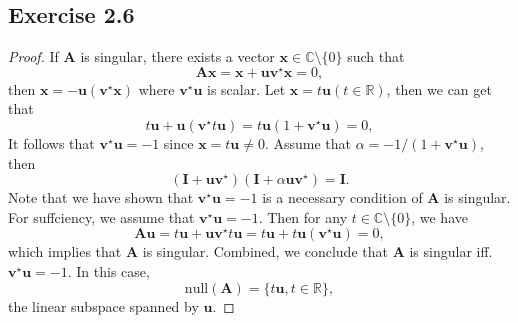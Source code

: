 \documentclass{article}
\begin{document}
\subsection{Exercise 2.6}
    \begin{proof}
        If $\bm{A}$ is singular, there exists a vector $\bm{x} \in \mathbb{C}\setminus \{0\}$ such that
        $$
         \bm{Ax} = \bm{x} + \bm{u}\bm{v}^{\star} \bm{x} = 0,
        $$
        then $\bm{x} = -\bm{u}(\bm{v}^{\star} \bm{x})$ where $\bm{v}^{\star} \bm{u}$ is scalar. Let $\bm{x} = t\bm{u} (t \in \mathbb{R})$, then we can get that 
        $$
        t\bm{u} + \bm{u} (\bm{v}^{\star} t \bm{u}) = t\bm{u} (1+ \bm{v}^{\star} \bm{u}) = 0,
        $$
        It follows that $\bm{v}^{\star} \bm{u} = -1$ since $\bm{x} = t\bm{u} \neq 0$. Assume that $\alpha = -1/(1 + \bm{v}^{\star} \bm{u})$, then
        $$
        (\bm{I}+\bm{u} \bm{v}^{\star})(\bm{I} + \alpha \bm{u}\bm{v}^{\star}) = \bm{I}.
        $$
        Note that we have shown that $\bm{v}^{\star}\bm{u} = -1$ is a necessary condition of $\bm{A}$ is singular. For suffciency, we assume that $\bm{v}^{\star} \bm{u} = -1$. Then for any $ t \in \mathbb{C} \setminus \{ 0 \}$, we have
        $$
        \bm{Au} = t\bm{u} + \bm{u}\bm{v}^{\star} t \bm{u} = t\bm{u} + t\bm{u} (\bm{v}^{\star} \bm{u}) = 0,
        $$
        which implies that $\bm{A}$ is singular. Combined, we conclude that $\bm{A}$ is singular iff. $\bm{v}^{\star} \bm{u} = -1$. In this case, 
        $$
        \mathrm{null} (\bm{A}) = \{ t\bm{u}, t \in \mathbb{R} \},
        $$
        the linear subspace spanned by $\bm{u}$.
    \end{proof}
    
\end{document}
